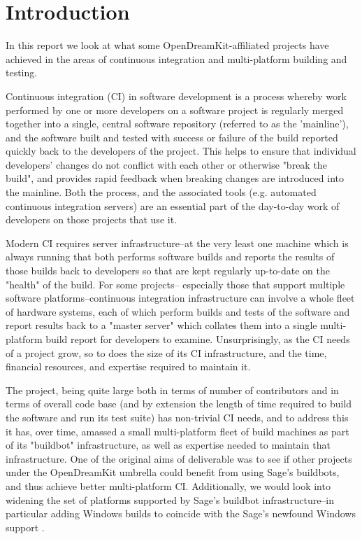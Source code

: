 \documentclass{deliverablereport}
\author{Erik Bray, et. al.}
\begin{document}
\maketitle

\hypertarget{introduction}{%
\section{Introduction}\label{introduction}}

In this report we look at what some OpenDreamKit-affiliated projects have
achieved in the areas of continuous integration and multi-platform building and
testing.

Continuous integration (CI) in software development is a process whereby work
performed by one or more developers on a software project is regularly merged
together into a single, central software repository (referred to as the
'mainline'), and the software built and tested with success or failure of the
build reported quickly back to the developers of the project.  This helps to
ensure that individual developers' changes do not conflict with each other or
otherwise "break the build", and provides rapid feedback when breaking changes
are introduced into the mainline.  Both the process, and the associated tools
(e.g. automated continuous integration servers) are an essential part of the
day-to-day work of developers on those projects that use it.

Modern CI requires server infrastructure--at the very least one machine which
is always running that both performs software builds and reports the results of
those builds back to developers so that are kept regularly up-to-date on the
"health" of the build.  For some projects-- especially those that support
multiple software platforms--continuous integration infrastructure can involve
a whole fleet of hardware systems, each of which perform builds and tests of
the software and report results back to a "master server" which collates them
into a single multi-platform build report for developers to examine.
Unsurprisingly, as the CI needs of a project grow, so to does the size of its
CI infrastructure, and the time, financial resources, and expertise required
to maintain it.

The \Sage project, being quite large both in terms of number of contributors
and in terms of overall code base (and by extension the length of time required
to build the software and run its test suite) has non-trivial CI needs, and to
address this it has, over time, amassed a small multi-platform fleet of build
machines as part of its "buildbot" infrastructure, as well as expertise needed
to maintain that infrastructure.  One of the original aims of deliverable was
to see if other projects under the OpenDreamKit umbrella could benefit from
using Sage's buildbots, and thus achieve better multi-platform CI.
Additionally, we would look into widening the set of platforms supported by
Sage's buildbot infrastructure--in particular adding Windows builds to coincide
with the Sage's newfound Windows support .
\end{document}
